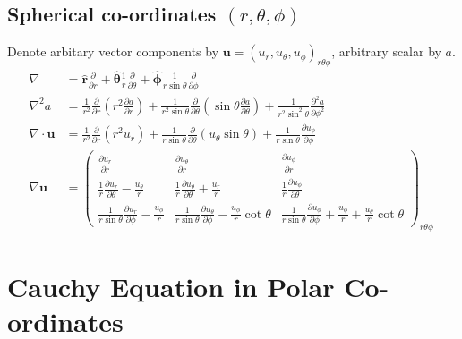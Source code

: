 \documentclass{jknotes}
\begin{document}
\subsection{Spherical co-ordinates $(r,\theta,\phi)$}
Denote arbitary vector components by $\symbf{u} = (u_r, u_\theta,
u_\phi)_{r\theta\phi}$, arbitrary scalar by $a$.
\begingroup
\addtolength{\jot}{.7em}
\renewcommand*{\arraystretch}{2}
\setlength\arraycolsep{.7em}
\begin{align}
	\nabla &= \hat{\symbf{r}} \frac{\partial}{\partial r} +
	\hat{\symbf{\theta}} \frac{1}{r}\frac{\partial}{\partial \theta} +
	\hat{\symbf{\phi}} \frac{1}{r\sin \theta} \frac{\partial}{\partial \phi}
	\\
	\nabla^2 a &= \frac{1}{r^2} \frac{\partial}{\partial r} \left( r^2
	\frac{\partial a}{\partial r} \right) + \frac{1}{r^2 \sin \theta}
	\frac{\partial}{\partial \theta} \left( \sin \theta \frac{\partial
	a}{\partial \theta} \right) + \frac{1}{r^2 \sin^2 \theta}
	\frac{\partial^2 a}{\partial \phi^2} \\
	\nabla \cdot \symbf{u} &= \frac{1}{r^2} \frac{\partial}{\partial r}(r^2
	u_r) + \frac{1}{r\sin\theta} \frac{\partial}{\partial \theta} (u_\theta
	\sin \theta) + \frac{1}{r\sin\theta}\frac{\partial u_\phi}{\partial \phi} \\
	\nabla \symbf{u} &= \begin{pmatrix}
		\frac{\partial u_r}{\partial r} & 
		\frac{\partial u_\theta}{\partial r} &
		\frac{\partial u_\phi}{\partial r} \\
		\frac{1}{r}\frac{\partial u_r}{\partial \theta} - \frac{u_\theta}{r} &
		\frac{1}{r}\frac{\partial u_\theta}{\partial \theta} + \frac{u_r}{r} &
		\frac{1}{r}\frac{\partial u_\phi}{\partial \theta} \\
		\frac{1}{r\sin\theta} \frac{\partial u_r}{\partial \phi} -
		\frac{u_\phi}{r} & 
		\frac{1}{r\sin\theta} \frac{\partial u_\theta}{\partial \phi} -
		\frac{u_\phi}{r}\cot \theta & 
		\frac{1}{r\sin\theta} \frac{\partial u_\phi}{\partial \phi} +
		\frac{u_\phi}{r} + \frac{u_\theta}{r}\cot\theta
	\end{pmatrix}_{r\theta\phi} \
\end{align}
\endgroup

\section{Cauchy Equation in Polar Co-ordinates}
\end{document}

